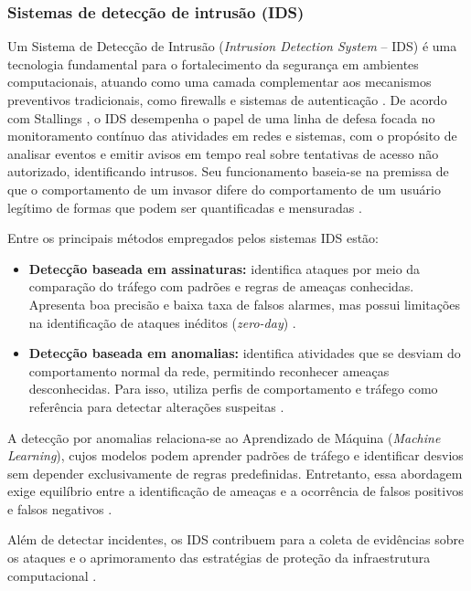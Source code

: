 \documentclass[
    12pt,                %
    openright,           %
    oneside,             %
    a4paper,             %
    english,             %
    brazil               %
]{abntex2}
\begin{document}
\subsubsection{Sistemas de detecção de intrusão (IDS)}

Um Sistema de Detecção de Intrusão (\textit{Intrusion Detection System} -- IDS) é uma tecnologia fundamental para o fortalecimento da segurança em ambientes computacionais, atuando como uma camada complementar aos mecanismos preventivos tradicionais, como firewalls e sistemas de autenticação \cite{stallings2020}. De acordo com Stallings \cite{stallings2020}, o IDS desempenha o papel de uma linha de defesa focada no monitoramento contínuo das atividades em redes e sistemas, com o propósito de analisar eventos e emitir avisos em tempo real sobre tentativas de acesso não autorizado, identificando intrusos. Seu funcionamento baseia-se na premissa de que o comportamento de um invasor difere do comportamento de um usuário legítimo de formas que podem ser quantificadas e mensuradas \cite{stallings2020}.

Entre os principais métodos empregados pelos sistemas IDS estão:

\begin{itemize}
    \item \textbf{Detecção baseada em assinaturas:} identifica ataques por meio da comparação do tráfego com padrões e regras de ameaças conhecidas. Apresenta boa precisão e baixa taxa de falsos alarmes, mas possui limitações na identificação de ataques inéditos (\textit{zero-day}) \cite{stallings2020}.

    \item \textbf{Detecção baseada em anomalias:} identifica atividades que se desviam do comportamento normal da rede, permitindo reconhecer ameaças desconhecidas. Para isso, utiliza perfis de comportamento e tráfego como referência para detectar alterações suspeitas \cite{stallings2020}.
\end{itemize}

A detecção por anomalias relaciona-se ao Aprendizado de Máquina (\textit{Machine Learning}), cujos modelos podem aprender padrões de tráfego e identificar desvios sem depender exclusivamente de regras predefinidas. Entretanto, essa abordagem exige equilíbrio entre a identificação de ameaças e a ocorrência de falsos positivos e falsos negativos \cite{gopalakrishnan2023}.

Além de detectar incidentes, os IDS contribuem para a coleta de evidências sobre os ataques e o aprimoramento das estratégias de proteção da infraestrutura computacional \cite{stallings2020}.
\end{document}
